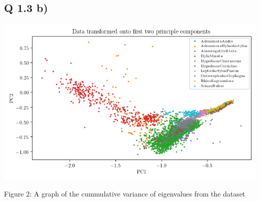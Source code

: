 \documentclass{report}
\begin{document}
\subsection*{Q 1.3 b)}
{
    \includegraphics{Years/Year2/Semester2/Learning/CW/python_code/pca.png}
    \caption{Figure 2: A graph of the cummulative variance of eigenvalues from the dataset}
}
\end{document}
